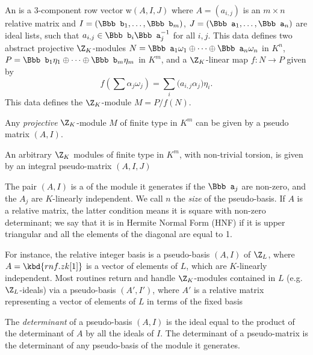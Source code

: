 \item An  is a 3-component row vector w$(A,I,J)$
where $A = (a_{i,j})$ is an $m\times n$ relative matrix and $I = ({\Bbb
b}_1,\dots, {\Bbb b}_m)$, $J = ({\Bbb a}_1,\dots, {\Bbb a}_n)$ are ideal
lists, such that $a_{i,j} \in {\Bbb b}_i {\Bbb a}_j^{-1}$ for all $i,j$. This
data defines two abstract projective $\Z_K$-modules $N = {\Bbb
a_1}\omega_1\oplus \cdots\oplus {\Bbb a_n}\omega_n $ in $K^n$, $P = {\Bbb
b_1}\eta_1\oplus \cdots\oplus {\Bbb b_m}\eta_m$ in $K^m$, and a $\Z_K$-linear
map $f:N\to P$ given by
$$ f(\sum \alpha_j\omega_j) = \sum_i \Big(a_{i,j}\alpha_j\Big) \eta_i.$$
This data defines the $\Z_K$-module $M = P/f(N)$.

\item Any \emph{projective} $\Z_K$-module $M$
of finite type in $K^m$ can be given by a pseudo matrix $(A,I)$.

\item An arbitrary $\Z_K$ modules of finite type in $K^m$, with non-trivial
torsion, is given by an integral pseudo-matrix $(A,I,J)$


\item The pair $(A,I)$ is a  of the module it
generates if the ${\Bbb a_j}$ are non-zero, and the $A_j$ are $K$-linearly
independent. We call $n$ the \emph{size} of the pseudo-basis. If $A$ is a
relative matrix, the latter condition means it is square with non-zero
determinant; we say that it is in Hermite Normal Form (HNF) if it is upper triangular and all the elements of the diagonal
are equal to 1.

\item For instance, the relative integer basis  is a pseudo-basis
$(A,I)$ of $\Z_L$, where $A = \kbd{rnf.zk[1]}$ is a vector of elements of $L$,
which are $K$-linearly independent. Most  routines return and handle
$\Z_K$-modules contained in $L$ (e.g.~$\Z_L$-ideals) via a pseudo-basis
$(A',I')$, where $A'$ is a relative matrix representing a vector of elements of
$L$ in terms of the fixed basis 

\item The \emph{determinant} of a pseudo-basis $(A,I)$ is the ideal
equal to the product of the determinant of $A$ by all the ideals of $I$. The
determinant of a pseudo-matrix is the determinant of any pseudo-basis of the
module it generates.

